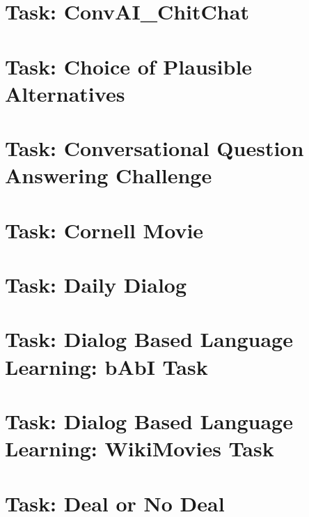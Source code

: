 \documentclass[twoside]{book}
\newcommand{\+}{\discretionary{\mbox{\scriptsize$\hookleftarrow$}}{}{}}
\begin{document}
\chapter{Task\+: Conv\+A\+I\+\_\+\+Chit\+Chat}
\label{md_parlai_tasks_convai_chitchat_README}

\chapter{Task\+: Choice of Plausible Alternatives}
\label{md_parlai_tasks_copa_README}

\chapter{Task\+: Conversational Question Answering Challenge}
\label{md_parlai_tasks_coqa_README}

\chapter{Task\+: Cornell Movie}
\label{md_parlai_tasks_cornell_movie_README}

\chapter{Task\+: Daily Dialog}
\label{md_parlai_tasks_dailydialog_README}

\chapter{Task\+: Dialog Based Language Learning\+: b\+AbI Task}
\label{md_parlai_tasks_dbll_babi_README}

\chapter{Task\+: Dialog Based Language Learning\+: Wiki\+Movies Task}
\label{md_parlai_tasks_dbll_movie_README}

\chapter{Task\+: Deal or No Deal}
\label{md_parlai_tasks_dealnodeal_README}

\end{document}
